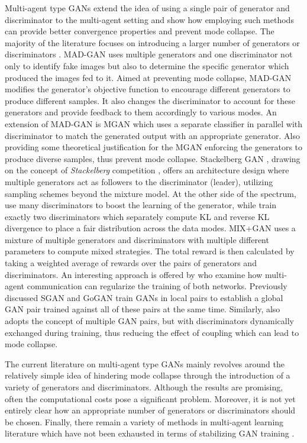 Multi-agent type GANs extend the idea of using a single pair of generator and discriminator to the multi-agent setting and show how employing such methods can provide better convergence properties and prevent mode collapse. The majority of the literature focuses on introducing a larger number of generators  or discriminators .
MAD-GAN  uses multiple generators and one discriminator not only to identify fake images but also to determine the specific generator which produced the images fed to it. Aimed at preventing mode collapse, MAD-GAN modifies the generator's objective function to encourage different generators to produce different samples. It also changes the discriminator to account for these generators and provide feedback to them accordingly to various modes. An extension of MAD-GAN is MGAN  which uses a separate classifier in parallel with discriminator to match the generated output with an appropriate generator. Also providing some theoretical justification for the MGAN enforcing the generators to produce diverse samples, thus prevent mode collapse. Stackelberg GAN , drawing on the concept of \textit{Stackelberg} competition , offers an architecture design where multiple generators act as followers to the discriminator (leader), utilizing sampling schemes beyond the mixture model.
At the other side of the spectrum,  use many discriminators to boost the learning of the generator, while  train exactly two discriminators which separately compute KL and reverse KL divergence to place a fair distribution across the data modes.
MIX+GAN  uses a mixture of multiple generators and discriminators with multiple different parameters to compute mixed strategies. The total reward is then calculated by taking a weighted average of rewards over the pairs of generators and discriminators. An interesting approach is offered by  who examine how multi-agent communication can regularize the training of both networks. Previously discussed SGAN  and GoGAN  train GANs in local pairs to establish a global GAN pair trained against all of these pairs at the same time. Similarly,  also adopts the concept of multiple GAN pairs, but with discriminators dynamically exchanged during training, thus reducing the effect of coupling which can lead to mode collapse.

The current literature on multi-agent type GANs mainly revolves around the relatively simple idea of hindering mode collapse through the introduction of a variety of generators and discriminators. Although the results are promising, often the computational costs pose a significant problem. Moreover, it is not yet entirely clear how an appropriate number of generators or discriminators should be chosen. Finally, there remain a variety of methods in multi-agent learning literature which have not been exhausted in terms of stabilizing GAN training .

